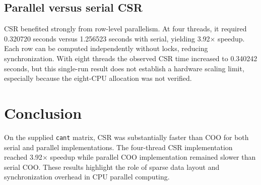 \documentclass[sigconf,nonacm]{acmart}
\begin{document}
\subsection{Parallel versus serial CSR}
CSR benefited strongly from row-level parallelism. At four threads, it required 0.320720 seconds versus 1.256523 seconds with serial, yielding 3.92$\times$ speedup. Each row can be computed independently without locks, reducing synchronization. With eight threads the observed CSR time increased to 0.340242 seconds, but this single-run result does not establish a hardware scaling limit, especially because the eight-CPU allocation was not verified.


\section{Conclusion}
On the supplied \texttt{cant} matrix, CSR was substantially faster than COO for both serial and parallel implementations. The four-thread CSR implementation reached 3.92$\times$ speedup while parallel COO implementation remained slower than serial COO. These results highlight the role of sparse data layout and synchronization overhead in CPU parallel computing.
\end{document}
